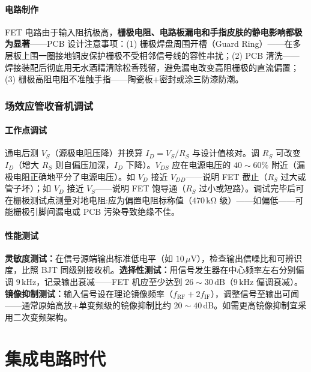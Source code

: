\documentclass[12pt,UTF8]{ctexbook}
\begin{document}
\subsection{电路制作}

FET 电路由于输入阻抗极高，\textbf{栅极电阻、电路板漏电和手指皮肤的静电影响都极为显著}——PCB 设计注意事项：(1) 栅极焊盘周围开槽（Guard Ring）——在多层板上围一圈接地铜皮保护栅极不受相邻信号线的容性串扰；(2) PCB 清洗——焊接装配后彻底用无水酒精清除松香残留，避免漏电改变高阻栅极的直流偏置；(3) 栅极高阻电阻不准触手指——陶瓷板+密封或涂三防漆防潮。

\section{场效应管收音机调试}
\label{sec:fet_radio_debugging}

\subsection{工作点调试}

通电后测 $V_S$（源极电阻压降）并换算 $I_D = V_S/R_S$ 与设计值核对。调 $R_S$ 可改变 $I_D$（增大 $R_S$ 则自偏压加深，$I_D$ 下降）。$V_{DS}$ 应在电源电压的 $40\sim60\%$ 附近（漏极电阻正确地平分了电源电压）。如 $V_D$ 接近 $V_{DD}$——说明 FET 截止（$R_S$ 过大或管子坏）；如 $V_D$ 接近 $V_S$——说明 FET 饱导通（$R_S$ 过小或短路）。调试完毕后可在栅极测试点测量对地电阻:应为偏置电阻标称值（$470\,\mathrm{k\Omega}$ 级）——如偏低——可能栅极引脚间漏电或 PCB 污染导致绝缘不佳。

\subsection{性能测试}

\textbf{灵敏度测试：}在信号源端输出标准低电平（如 $10\,\mu\mathrm{V}$），检查输出信噪比和可辨识度，比照 BJT 同级别接收机。\textbf{选择性测试：}用信号发生器在中心频率左右分别偏调 $9\,\mathrm{kHz}$，记录输出衰减——FET 机应至少达到 $26\sim30\,\mathrm{dB}$（$9\,\mathrm{kHz}$ 偏调衰减）。\textbf{镜像抑制测试：}输入信号设在理论镜像频率（$f_{\text{RF}}+2f_{\text{IF}}$），调整信号至输出可闻——通常原始高放+单变频级的镜像抑制比约 $20\sim40\,\mathrm{dB}$。如需更高镜像抑制宜采用二次变频架构。


\part{集成电路时代}
\end{document}

